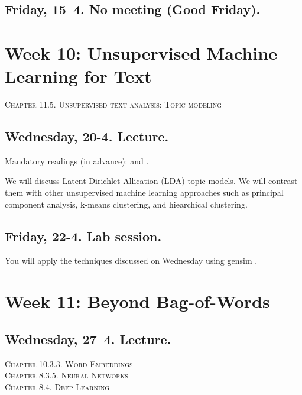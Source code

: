 \subsection*{Friday, 15--4. No meeting (Good Friday).}




\section*{Week 10: Unsupervised Machine Learning for Text}
\textsc{ Chapter 11.5. Unsupervised text analysis: Topic modeling}\\

\subsection*{Wednesday, 20-4. Lecture.}
Mandatory readings (in advance): \cite{Maier2018a} and \cite{Tsur2015}.

We will discuss Latent Dirichlet Allication (LDA) topic models. We will contrast them with other unsupervised machine learning approaches such as principal component analysis, k-means clustering, and hiearchical clustering.


\subsection*{Friday, 22-4. Lab session.}
You will apply the techniques discussed on Wednesday using gensim \citep{Rehurek2010}.






\section*{Week 11: Beyond Bag-of-Words}

\subsection*{Wednesday, 27--4. Lecture.}
\textsc{ Chapter 10.3.3. Word Embeddings}\\
\textsc{ Chapter 8.3.5. Neural Networks}\\
\textsc{ Chapter 8.4. Deep Learning}\\

